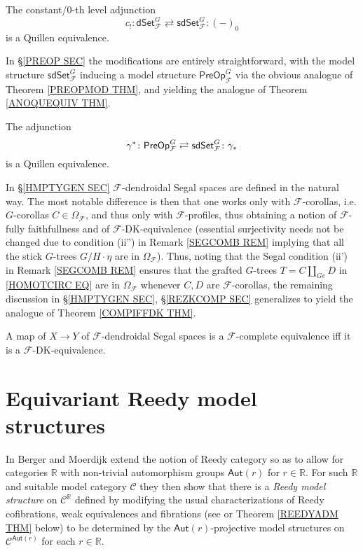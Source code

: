 \documentclass[a4paper,10pt
]{article}%
\begin{document}
\begin{theorem}\label{FINC0AGJ THM}
	The constant/$0$-th level adjunction
	\[
	c_!\colon 
	\mathsf{dSet}^G_{\mathcal{F}} \rightleftarrows \mathsf{sdSet}^G_{\mathcal{F}}
	\colon (-)_0
	\]
	is a Quillen equivalence.
\end{theorem}
In \S \ref{PREOP SEC} the modifications are entirely straightforward, with the model structure 
$\mathsf{sdSet}^G_{\mathcal{F}}$
inducing a model structure
$\mathsf{PreOp}^G_{\mathcal{F}}$ via the obvious analogue of 
Theorem \ref{PREOPMOD THM}, and yielding the analogue of Theorem \ref{ANOQUEQUIV THM}.
\begin{theorem}\label{FANOQUEQUIV THM}
The adjunction
\[
	\gamma^{\**} \colon \mathsf{PreOp}^G_{\mathcal{F}}
\rightleftarrows
	\mathsf{sdSet}^G_{\mathcal{F}} \colon \gamma_{\**}
\]
is a Quillen equivalence.
\end{theorem}
In \S \ref{HMPTYGEN SEC} $\mathcal{F}$-dendroidal Segal spaces are defined in the natural way. The most notable difference is then that one works only with 
$\mathcal{F}$-corollas, i.e. $G$-corollas
$C \in \Omega_{\mathcal{F}}$,
and thus only with $\mathcal{F}$-profiles, thus obtaining a notion of $\mathcal{F}$-fully faithfullness and of $\mathcal{F}$-DK-equivalence 
(essential surjectivity needs not be changed due to condition (ii'') in Remark \ref{SEGCOMB REM} implying that all the stick $G$-trees $G/H \cdot \eta$ are in $\Omega_{\mathcal{F}}$).
Thus, noting that the Segal condition (ii') in Remark \ref{SEGCOMB REM}
ensures that the grafted $G$-trees 
$T=C \amalg_{Ge} D$ in \eqref{HOMOTCIRC EQ}
are in $\Omega_{\mathcal{F}}$
whenever $C,D$ are $\mathcal{F}$-corollas,
the remaining discussion in 
\S \ref{HMPTYGEN SEC}, \S \ref{REZKCOMP SEC}
generalizes to yield the analogue of 
Theorem \ref{COMPIFFDK THM}.
\begin{theorem}\label{FCOMPIFFDK THM}
A map of $X \to Y$ of $\mathcal{F}$-dendroidal Segal spaces is a $\mathcal{F}$-complete equivalence iff it is a $\mathcal{F}$-DK-equivalence.
\end{theorem}



\appendix

\section{Equivariant Reedy model structures}\label{EQREED AP}


In \cite{BM11} Berger and Moerdijk extend the notion of Reedy category so as to allow for categories $\mathbb{R}$
 with non-trivial automorphism groups 
 $\mathsf{Aut}(r)$ for $r \in \mathbb{R}$.
For such $\mathbb{R}$ and suitable model category $\mathcal{C}$ they then show that there is a 
\textit{Reedy model structure}
on $\mathcal{C}^{\mathbb{R}}$
defined by modifying the usual characterizations of
Reedy cofibrations, weak equivalences and fibrations
(see \cite[Thm. 1.6]{BM11} or
Theorem \ref{REEDYADM THM} below)
 to be determined by the $\mathsf{Aut}(r)$-projective model structures
on $\mathcal{C}^{\mathsf{Aut}(r)}$
for each $r \in \mathbb{R}$. 
\end{document}
